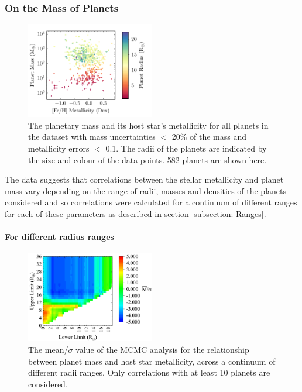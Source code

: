 \documentclass[a4paper,twocolumn,12pt]{article}
\begin{document}
\subsubsection{On the Mass of Planets}

\begin{figure}[h!]
    \centering
    \includegraphics[width=0.5\textwidth]{Graphs/FeH vs Mass Planet Plot.pdf}
    \caption{The planetary mass and its host star's metallicity for all planets in the dataset with mass uncertainties $<$ 20\% of the mass and metallicity errors $<$ 0.1. The radii of the planets are indicated by the size and colour of the data points. 582 planets are shown here.}
    \label{figure: Fe/H vs Mass parameter plot}
\end{figure}

The data suggests that correlations between the stellar metallicity and planet mass vary depending on the range of radii, masses and densities of the planets considered and so correlations were calculated for a continuum of different ranges for each of these parameters as described in section \ref{subsection: Ranges}.


\paragraph{For different radius ranges}

\begin{figure}[h!]
    \centering
    \includegraphics[width=0.5\textwidth]{Graphs/FeH vs Mass correlations - Radii ranges.pdf}
    \caption{The mean/$\sigma$ value of the MCMC analysis for the relationship between planet mass and host star metallicity, across a continuum of different radii ranges. Only correlations with at least 10 planets are considered.}
    \label{figure: Fe/H vs Mass correlations - Radii ranges}
\end{figure}
\end{document}
